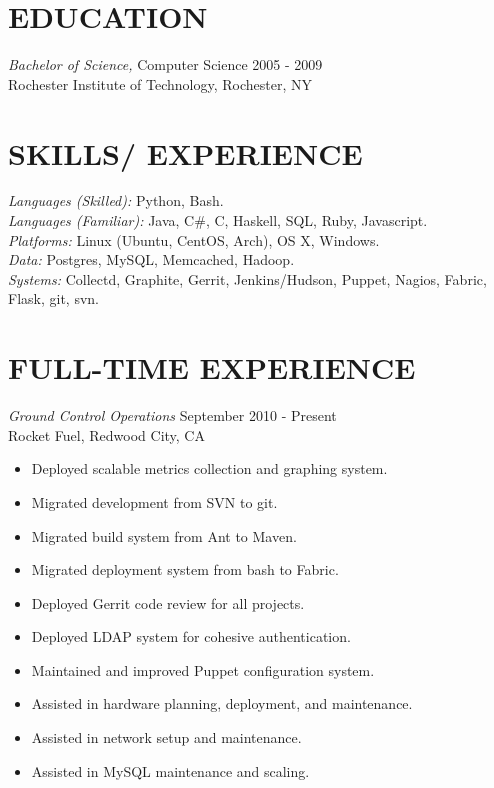 \documentclass[line,margin]{res}
\begin{document}
\address{Foster City, CA 94404}
\address{\sl tabletcorry@gmail.com}

\begin{resume}
 
\section{EDUCATION} {\sl Bachelor of Science,} Computer Science \hfill    2005 - 2009 \\
                Rochester Institute of Technology, Rochester, NY
 
\section{SKILLS/ EXPERIENCE} {\sl Languages (Skilled):} Python, Bash.\\
                {\sl Languages (Familiar):} Java, C\#, C, Haskell, SQL, Ruby, Javascript.\\
                {\sl Platforms:} Linux (Ubuntu, CentOS, Arch), OS X, Windows. \\
                {\sl Data:} Postgres, MySQL, Memcached, Hadoop. \\
                {\sl Systems:} Collectd, Graphite, Gerrit, Jenkins/Hudson, Puppet, Nagios, Fabric, Flask, git, svn.
 
\section{FULL-TIME EXPERIENCE} 
                {\sl Ground Control Operations} \hfill September 2010 - Present \\
                Rocket Fuel, Redwood City, CA
                \begin{itemize}  \itemsep -2pt
                 \item Deployed scalable metrics collection and graphing system.
                 \item Migrated development from SVN to git.
                 \item Migrated build system from Ant to Maven.
                 \item Migrated deployment system from bash to Fabric.
                 \item Deployed Gerrit code review for all projects.
                 \item Deployed LDAP system for cohesive authentication.
                 \item Maintained and improved Puppet configuration system.
                 \item Assisted in hardware planning, deployment, and maintenance.
                 \item Assisted in network setup and maintenance.
                 \item Assisted in MySQL maintenance and scaling.
                \end{itemize}


\end{resume}
\end{document}
